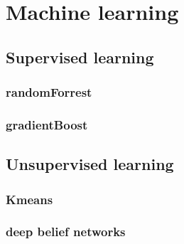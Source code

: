 \chapter{Machine learning}


\section{Supervised learning}
\subsection{randomForrest}
\subsection{gradientBoost}

\section{Unsupervised learning}
\subsection{Kmeans}
\subsection{deep belief networks}

